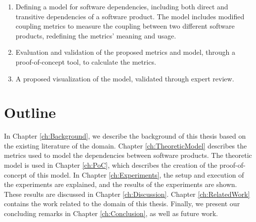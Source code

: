 \begin{enumerate}
	\item Defining a model for software dependencies, including both direct and transitive dependencies of a software product. The model includes modified coupling metrics to measure the coupling between two different software products, redefining the metrics' meaning and usage.
  \blankls

	\item Evaluation and validation of the proposed metrics and model, through a proof-of-concept tool, to calculate the metrics.

  \item A proposed visualization of the model, validated through expert review.
\end{enumerate}

\section{Outline}
In Chapter \ref{ch:Background}, we describe the background of this thesis based on the existing literature of the domain.
Chapter \ref{ch:TheoreticModel} describes the metrics used to model the dependencies between software products.
The theoretic model is used in Chapter \ref{ch:PoC}, which describes the creation of the proof-of-concept of this model.
In Chapter \ref{ch:Experiments}, the setup and execution of the experiments are explained, and the results of the experiments are shown. These results are discussed in Chapter \ref{ch:Discussion}. Chapter \ref{ch:RelatedWork} contains the work related to the domain of this thesis.
Finally, we present our concluding remarks in Chapter \ref{ch:Conclusion}, as well as future work.
